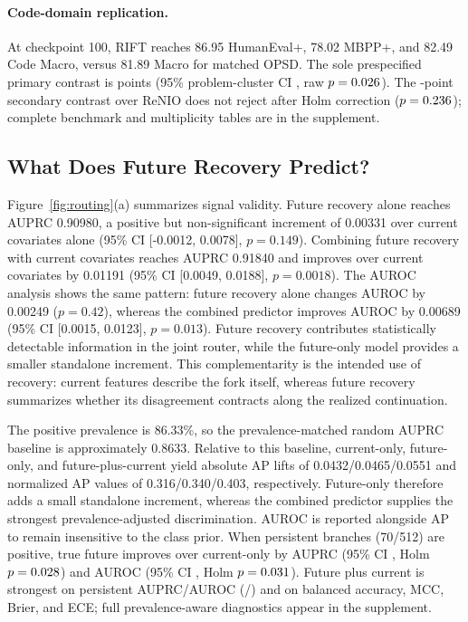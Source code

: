 \documentclass[letterpaper]{article}
\newcommand{\RIFT}{\textsc{RIFT}}
\begin{document}
\BaselineResultSentence{}

\paragraph{Code-domain replication.}
At checkpoint 100, \RIFT{} reaches 86.95 HumanEval+, 78.02 MBPP+, and 82.49
Code Macro, versus 81.89 Macro for matched OPSD. The sole prespecified primary
contrast is \CodeRiftVsMatchedDelta{} points (95\% problem-cluster CI
\CodeRiftVsMatchedCI{}, raw $p=0.026$). The
\CodeRiftVsReNIODelta{}-point secondary contrast over ReNIO does not reject
after Holm correction ($p=0.236$); complete benchmark and
multiplicity tables are in the supplement.

\subsection{What Does Future Recovery Predict?}

Figure~\ref{fig:routing}(a) summarizes signal validity. Future recovery alone
reaches AUPRC 0.90980, a positive but non-significant increment
of 0.00331 over current covariates alone (95\% CI [-0.0012, 0.0078],
$p=0.149$). Combining future recovery with current covariates reaches AUPRC
0.91840 and improves over current covariates by 0.01191 (95\% CI
[0.0049, 0.0188], $p=0.0018$). The AUROC analysis shows the same pattern:
future recovery alone changes AUROC by 0.00249 ($p=0.42$), whereas the combined
predictor improves AUROC by 0.00689 (95\% CI [0.0015, 0.0123], $p=0.013$).
Future recovery contributes statistically detectable information in the joint
router, while the future-only model provides a smaller standalone increment.
This complementarity is the intended use of recovery: current features
describe the fork itself, whereas future recovery summarizes whether its
disagreement contracts along the realized continuation.

The positive prevalence is 86.33\%, so the prevalence-matched random AUPRC
baseline is approximately 0.8633. Relative to this baseline, current-only,
future-only, and future-plus-current yield absolute AP lifts of
0.0432/0.0465/0.0551 and normalized AP values of 0.316/0.340/0.403,
respectively. Future-only therefore adds a small standalone increment, whereas
the combined predictor supplies the strongest prevalence-adjusted
discrimination. AUROC is reported alongside AP to remain insensitive to the
class prior. When persistent branches (70/512) are positive, true future
improves over current-only by \FuturePersistentAUPRCDelta{} AUPRC
(95\% CI \FuturePersistentAUPRCCI{}, Holm $p=0.028$)
and \FuturePersistentAUROCDelta{} AUROC (95\% CI
\FuturePersistentAUROCCI{}, Holm $p=0.031$).
Future plus current is strongest on persistent AUPRC/AUROC
(\FutureCurrentPersistentAUPRC{}/\FutureCurrentPersistentAUROC{}) and on
balanced accuracy, MCC, Brier, and ECE; full prevalence-aware diagnostics
appear in the supplement.
\end{document}
